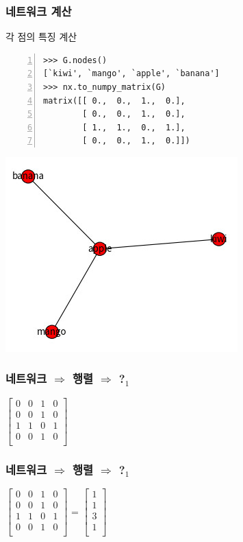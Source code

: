 \documentclass{beamer}
\begin{document}
\begin{frame}[fragile]
\frametitle{네트워크 계산}
\begin{block}{각 점의 특징 계산}
\begin{Verbatim}[numbers=left,commandchars=\\\{\}]
>>> G.nodes()
[`kiwi', `mango', `apple', `banana']
>>> nx.to_numpy_matrix(G)
matrix([[ 0.,  0.,  1.,  0.],
        [ 0.,  0.,  1.,  0.],
        [ 1.,  1.,  0.,  1.],
        [ 0.,  0.,  1.,  0.]])
\end{Verbatim}
\end{block}
\begin{center}
\includegraphics[scale=0.35]{network_basic1.jpg}
\end{center}
\end{frame}

\begin{frame}[fragile]
\frametitle{네트워크 $\Rightarrow$ 행렬 $\Rightarrow$ ?$_1$}
\begin{center}
\huge
\(
  \begin{bmatrix}
    0 & 0 & 1 & 0\\
    0 & 0 & 1 & 0\\
    1 & 1 & 0 & 1\\
    0 & 0 & 1 & 0\\
  \end{bmatrix}
\)
\end{center}
\end{frame}

\begin{frame}[fragile]
\frametitle{네트워크 $\Rightarrow$ 행렬 $\Rightarrow$ ?$_1$}
\begin{center}
\huge
\(
  \begin{bmatrix}
    0 & 0 & 1 & 0\\
    0 & 0 & 1 & 0\\
    1 & 1 & 0 & 1\\
    0 & 0 & 1 & 0\\
  \end{bmatrix}
\)
=
\(
  \begin{bmatrix}
    1\\
    1\\
    3\\
    1\\
  \end{bmatrix}
\)
\end{center}
\end{frame}
\end{document}
